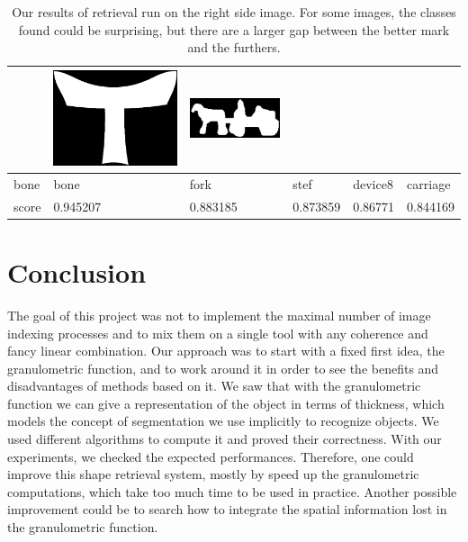 \begin{table}[h!]
\begin{tabular}{ | m{2.2cm} | m{2.2cm} | m{2.2cm} | m{2.2cm} | m{2.2cm} | m{2.2cm} | }
\begin{minipage}{.3\textwidth}
    \end{minipage}
	&
    \begin{minipage}{.3\textwidth}
      \includegraphics[width=\linewidth, width=20mm]{images/device8}
    \end{minipage}
	&
    \begin{minipage}{.3\textwidth}
      \includegraphics[width=\linewidth, width=20mm]{images/carriage}
    \end{minipage}
	\\ \hline
	bone & bone & fork & stef & device8 & carriage \\ \hline
	score & 0.945207 & 0.883185 & 0.873859 & 0.86771 & 0.844169 \\ \hline
  \end{tabular}
  \caption{Our results of retrieval run on the right side image. For some images, the classes found could be surprising, but there are a larger gap between the better mark and the furthers.}
\end{table}


\section*{Conclusion}

The goal of this project was not to implement the maximal number of image indexing processes and to mix them on a single tool with any coherence and fancy linear combination. Our approach was to start with a fixed first idea, the granulometric function, and to work around it in order to see the benefits and disadvantages of methods based on it. We saw that with the granulometric function we can give a representation of the object in terms of thickness, which models the concept of segmentation we use implicitly to recognize objects. We used different algorithms to compute it and proved their correctness. With our experiments, we checked the expected performances. Therefore, one could improve this shape retrieval system, mostly by speed up the granulometric computations, which take too much time to be used in practice. Another possible improvement could be to search how to integrate the spatial information lost in the granulometric function.







